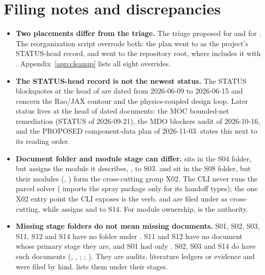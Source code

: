\section{Filing notes and discrepancies}\label{sec:inv-notes}

\begin{itemize}
  \item \textbf{Two placements differ from the triage.} The triage proposed  for  and  for . The reorganization script overrode both: the plan went to  as the project's STATUS-head record, and  went to the repository root, where  includes it with . Appendix~\ref{app:cleanup} lists all eight overrides.
  \item \textbf{The STATUS-head record is not the newest status.} The STATUS blockquotes at the head of  are dated from 2026-06-09 to 2026-06-15 and concern the Rao/JAX contour and the physics-coupled design loop. Later status lives at the head of dated documents: the MOC bounded-net remediation (STATUS of 2026-09-21), the MDO blockers audit of 2026-10-16, and the PROPOSED component-data plan of 2026-11-03.  states this next to its reading order.
  \item \textbf{Document folder and module stage can differ.}  sits in the S04 folder, but  assigns the module it describes, , to S03.  and  sit in the S08 folder, but their modules (, ) form the cross-cutting group X02. The CLI never runs the parcel solver ( imports the spray package only for its handoff types); the one X02 entry point the CLI exposes is the  verb.  and  are filed under  as cross-cutting, while  assigns  and  to S14. For module ownership,  is the authority.
  \item \textbf{Missing stage folders do not mean missing documents.} S01, S02, S03, S11, S12 and S14 have no folder under . S11 and S12 have no document whose primary stage they are, and S01 had only . S02, S03 and S14 do have such documents (, , ; ; ). They are audits, literature ledgers or evidence and were filed by kind.  lists them under their stages.

\end{itemize}
